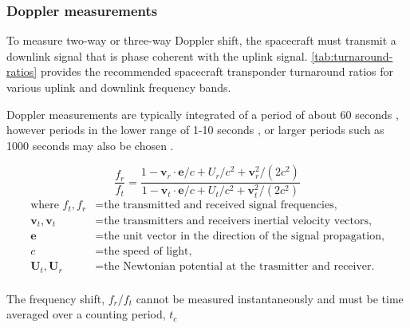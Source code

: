 \subsubsection{Doppler measurements}

To measure two-way or three-way Doppler shift, the spacecraft must transmit a
downlink signal that is phase coherent with the uplink signal.
\autoref{tab:turnaround-ratios} provides the recommended spacecraft transponder
turnaround ratios for various uplink and downlink frequency bands.

Doppler measurements are typically integrated of a period of about 60 seconds
\cite{}, however periods in the lower range of 1-10 seconds \cite{}, or larger
periods such as 1000 seconds may also be chosen \cite{}.


\cite{Soffel1989}

\begin{equation}
    \frac{f_r}{f_t} = \frac{
        1-\mathbf{v}_r\cdot{}\mathbf{e}/c + U_r/c^2 +\mathbf{v}_r^2/(2c^2)
    }{
        1-\mathbf{v}_t\cdot{}\mathbf{e}/c + U_t/c^2 +\mathbf{v}_t^2/(2c^2)
    }
\end{equation}
\begin{equation*}
    \begin{aligned}
        \textrm{where  }
        f_t, f_r & = \textrm{the transmitted and received signal frequencies,}            \\
        \mathbf{v}_t, \mathbf{v}_t & = \textrm{the transmitters and receivers inertial velocity vectors,}   \\
        \mathbf{e}                 & = \textrm{the unit vector in the direction of the signal propagation,} \\
        c                          & = \textrm{the speed of light,}                                         \\
        \mathbf{U}_t, \mathbf{U}_r & = \textrm{the Newtonian potential at the trasmitter and receiver.}     \\
    \end{aligned}
\end{equation*}

The frequency shift, $f_r/f_t$ cannot be measured instantaneously and must be
time averaged over a counting period, $t_c$


